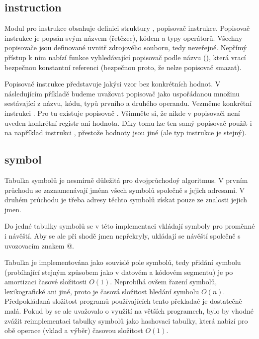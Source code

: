 \documentclass[czech, kiv, he, sem, pdf, viewonly]{fasthesis}
\begin{document}
\subsection{instruction}\label{sec:instruction}

Modul pro instrukce obsahuje definici struktury
, popisovač instrukce. Popisovač instrukce je
popsán svým názvem (řetězec), kódem a typy operátorů. Všechny popisovače jsou
definované uvnitř zdrojového souboru, tedy neveřejné. Nepřímý přístup k nim
nabízí funkce vyhledávající popisovač podle názvu (), která vrací
bezpečnou konstantní referenci (bezpečnou proto, že nelze popisovač smazat).

Popisovač instrukce představuje jakýsi vzor bez konkrétních hodnot. V
následujícím příkladě budeme uvažovat popisovač jako uspořádanou množinu
sestávající z názvu, kódu, typů prvního a druhého operandu. Vezměme konkrétní
instrukci . Pro tu existuje popisovač
. Všimněte si, že nikde v popisovači není
uveden konkrétní registr ani hodnota. Díky tomu lze ten samý popisovač použít i
na například instrukci , přestože hodnoty jsou jiné (ale typ
instrukce je stejný).

\subsection{symbol}

Tabulka symbolů je nesmírně důležitá pro dvojprůchodoý algoritmus. V prvním
průchodu se zaznamenávají jména všech symbolů společně s jejich adresami. V
druhém průchodu je třeba adresy těchto symbolů získat pouze ze znalosti jejich
jmen.

Do jedné tabulky symbolů se v této implementaci vkládají symboly pro proměnné i
návěští. Aby se ale při shodě jmen nepřekryly, ukládají se návěští společně s
uvozovacím znakem @.

Tabulka je implementována jako souvislé pole symbolů, tedy přidání symbolu
(probíhající stejným způsobem jako v datovém a kódovém segmentu) je po
amortizaci časové složitosti $O(1)$. Neprobíhá ovšem řazení symbolů,
lexikografické ani jiné, proto je časová složitost hledání symbolu $O(n)$.
Předpokládaná složitost programů používajících tento překladač je dostatečně
malá. Pokud by se ale uvažovalo o využití na větších programech, bylo by vhodné
zvážit reimplementaci tabulky symbolů jako hashovaci tabulky, která nabízí pro
obě operace (vklad a výběr) časovou složitost $O(1)$.
\end{document}
